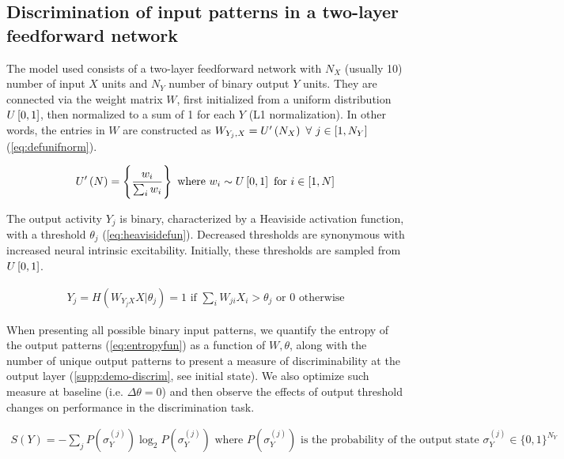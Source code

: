 \subsection{Discrimination of input patterns in a two-layer feedforward network}

The model used consists of a two-layer feedforward network
        with $N_X$ (usually 10) number of input $X$ units
        and $N_Y$ number of binary output $Y$ units.
    They are connected via the weight matrix $W$,
        first initialized from a uniform distribution $U\left[0,1\right]$,
        then normalized to a sum of 1 for each $Y$ (L1 normalization).
    In other words, the entries in $W$ are constructed as
        $W_{Y_j,X} = U^{\prime}\left(N_X\right) \ \forall \ j \in [1, N_Y]$
        (\autoref{eq:defunifnorm}).

\vspace{-1em}
\begin{align}
    U^{\prime}\left(N\right) = \left\{
            \dfrac{w_i}{\sum_i w_i}
            \right\}
        \text{ where } w_i \sim U\left[0,1\right]
        \text{ for }
        i \in [1, N]
    \label{eq:defunifnorm}
\end{align}

The output activity $Y_j$ is binary,
        characterized by a Heaviside activation function,
        with a threshold $\theta_j$ (\autoref{eq:heavisidefun}).
    Decreased thresholds are synonymous with increased neural intrinsic excitability.
    Initially, these thresholds are sampled from $U\left[0,1\right]$.

\vspace{-1em}
\begin{align}
    Y_j = H(W_{Y_j X} X | \theta_j) =
    1 \text{  if  } \sum_i W_{ji} X_i > \theta_j
    \text{ or } 0 \text{  otherwise}
    \label{eq:heavisidefun}
\end{align}

When presenting all possible binary input patterns,
        we quantify the entropy of the output patterns (\autoref{eq:entropyfun}) as a function of $W, \theta$,
        along with the number of unique output patterns
        to present a measure of discriminability at the output layer
        (\autoref{supp:demo-discrim}, see initial state).
    We also optimize such measure at baseline (i.e. $\Delta \theta = 0$)
        and then observe the effects of output threshold changes on performance in the discrimination task.


\vspace{-1em}
\begin{align}
    S(Y) = - \sum_j
        P\left(\sigma_Y^{(j)}\right)
        \log_2 P\left(\sigma_Y^{(j)}\right)
    \text{ where } P\left(\sigma_Y^{(j)}\right)
    \text{ is the probability of the output state }
    \sigma_Y^{(j)} \in \{0,1\}^{N_Y}
    \label{eq:entropyfun}
\end{align}


